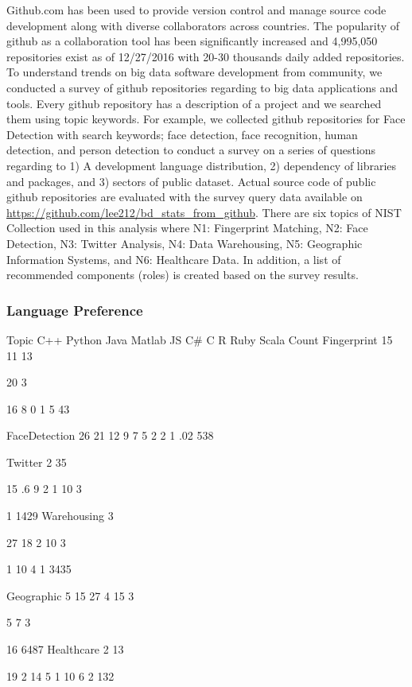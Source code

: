 \documentclass[9pt,twocolumn,twoside]{styles/osajnl}
\begin{document}
Github.com has been used to provide version control and manage source
code development along with diverse collaborators across
countries. The popularity of github as a collaboration tool has been
significantly increased and 4,995,050 repositories exist as of
12/27/2016 with 20-30 thousands daily added repositories. To
understand trends on big data software development from community, we
conducted a survey of github repositories regarding to big data
applications and tools. Every github repository has a description of a
project and we searched them using topic keywords. For example, we
collected github repositories for Face Detection with search keywords;
face detection, face recognition, human detection, and person
detection to conduct a survey on a series of questions regarding to 1)
A development language distribution, 2) dependency of libraries and
packages, and 3) sectors of public dataset. Actual source code of
public github repositories are evaluated with the survey query data
available on \url{https://github.com/lee212/bd_stats_from_github}. There are
six topics of NIST Collection used in this analysis where N1:
Fingerprint Matching, N2: Face Detection, N3: Twitter Analysis, N4:
Data Warehousing, N5: Geographic Information Systems, and N6:
Healthcare Data. In addition, a list of recommended components (roles)
is created based on the survey results.

\subsubsection{Language Preference}

Topic
	C++
	Python
	Java
	Matlab
	JS
	C\#
	C
	R
	Ruby
	Scala
	Count
	Fingerprint
	15%
	11%
	13%

	20%
	3%

	16%
	8%
	0%
	1%
	5%
	43

	FaceDetection
	26%
	21%
	12%
	9%
	7%
	5%
	2%
	2%
	1%
	.02%
	538

	Twitter
	2%
	35%

	15%
	.6%
	9%
	2%
	1%
	10%
	3%

	1%
	1429
	Warehousing
	3%

	27%
	18%
	2%
	10%
	3%

	1%
	10%
	4%
	1%
	3435

	Geographic
	5%
	15%
	27%
	4%
	15%
	3%

	5%
	7%
	3%

	16%
	6487
	Healthcare
	2%
	13%

	19%
	2%
	14%
	5%
	1%
	10%
	6%
	2%
	132
\end{document}
